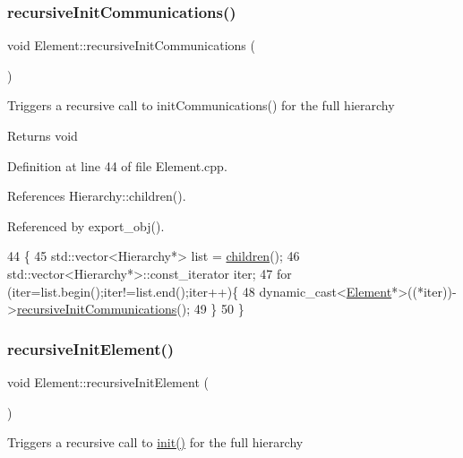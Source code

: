 \subsubsection{\texorpdfstring{recursive\+Init\+Communications()}{recursiveInitCommunications()}}
{\footnotesize\ttfamily void Element\+::recursive\+Init\+Communications (\begin{DoxyParamCaption}{ }\end{DoxyParamCaption})}

Triggers a recursive call to init\+Communications() for the full hierarchy

\begin{DoxyReturn}{Returns}
void 
\end{DoxyReturn}


Definition at line 44 of file Element.\+cpp.



References Hierarchy\+::children().



Referenced by export\+\_\+obj().


\begin{DoxyCode}
44                                          \{
45   std::vector<Hierarchy*> list = \hyperlink{classHierarchy_aa9a76f69e98e052ee1a6e32cea006288}{children}();
46   std::vector<Hierarchy*>::const\_iterator iter;
47   \textcolor{keywordflow}{for} (iter=list.begin();iter!=list.end();iter++)\{
48     \textcolor{keyword}{dynamic\_cast<}\hyperlink{classElement}{Element}*\textcolor{keyword}{>}((*iter))->\hyperlink{classElement_a82119ed37dff76508a2746a853ec35ba}{recursiveInitCommunications}();
49   \}
50 \}
\end{DoxyCode}
\mbox{\label{classElement_a3c0abcb36f8906688bb7e32608df7086}} 
\subsubsection{\texorpdfstring{recursive\+Init\+Element()}{recursiveInitElement()}}
{\footnotesize\ttfamily void Element\+::recursive\+Init\+Element (\begin{DoxyParamCaption}{ }\end{DoxyParamCaption})}

Triggers a recursive call to \hyperlink{classElement_af42754b5cabc198869222725218d695c}{init()} for the full hierarchy

